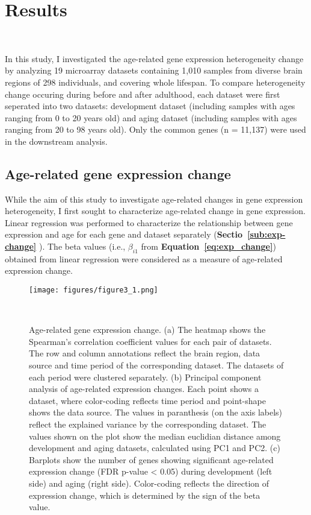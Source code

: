 \chapter{Results}~\label{chp:b3}

In this study, I investigated the age-related gene expression heterogeneity change by analyzing 19 microarray datasets
containing 1,010 samples from diverse brain regions of 298 individuals, and covering whole lifespan.
To compare heterogeneity change occuring during before and after adulthood, each dataset were first seperated into two datasets: development dataset 
(including samples with ages ranging from 0 to 20 years old) and aging dataset (including samples with ages ranging from 20 to 98 years old).
Only the common genes (n = 11,137) were used in the downstream analysis.

\section{Age-related gene expression change}
While the aim of this study to investigate age-related changes in gene expression heterogeneity, I first sought to characterize age-related change in gene expression.
Linear regression was performed to characterize the relationship between gene expression and age for each gene and dataset separately (\textbf{Sectio~\ref{sub:exp-change}} ).
The beta values (i.e., $\beta_{i1}$ from \textbf{Equation~\ref{eq:exp_change}}) obtained from linear regression were considered as a measure of age-related expression change.

\begin{figure}[h]
    \centering
    \texttt{[image: figures/figure3\_1.png]}
    \caption{Age-related gene expression change. 
    (a) The heatmap shows the Spearman's correlation coefficient values for each pair of datasets.
    The row and column annotations reflect the brain region, data source and time period of the corresponding dataset.
    The datasets of each period were clustered separately.
    (b) Principal component analysis of age-related expression changes. Each point shows a dataset, 
    where color-coding reflects time period and point-shape shows the data source. 
    The values in paranthesis (on the axis labels) reflect the explained variance by the corresponding dataset.
    The values shown on the plot show the median euclidian distance among development and aging datasets, 
    calculated using PC1 and PC2.
    (c) Barplots show the number of genes showing significant age-related expression change (FDR p-value < 0.05) during development (left side) and aging (right side).
    Color-coding reflects the direction of expression change, which is determined by the sign of the beta value.
    }~\label{fig:fig3.1}
\end{figure}

